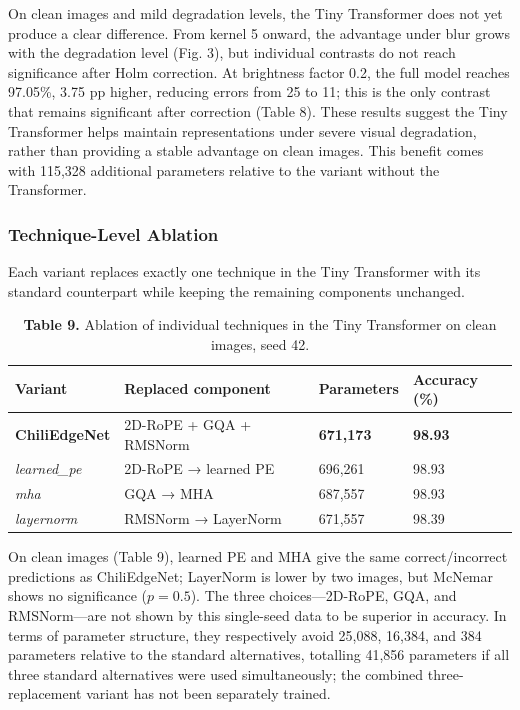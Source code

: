 On clean images and mild degradation levels, the Tiny Transformer does not yet produce a clear difference. From kernel 5 onward, the advantage under blur grows with the degradation level (Fig. 3), but individual contrasts do not reach significance after Holm correction. At brightness factor 0.2, the full model reaches 97.05\%, 3.75 pp higher, reducing errors from 25 to 11; this is the only contrast that remains significant after correction (Table 8). These results suggest the Tiny Transformer helps maintain representations under severe visual degradation, rather than providing a stable advantage on clean images. This benefit comes with 115,328 additional parameters relative to the variant without the Transformer.

\subsubsection{Technique-Level Ablation}\label{technique-level-ablation}

Each variant replaces exactly one technique in the Tiny Transformer with its standard counterpart while keeping the remaining components unchanged.

\begin{table}[H]
\centering
\caption*{\textbf{Table 9.} Ablation of individual techniques in the Tiny Transformer on clean images, seed 42.}
\label{tab:9}
\scriptsize
\setlength{\tabcolsep}{3pt}
\renewcommand{\arraystretch}{1.15}
\begin{tabular}{llll}
\toprule
\textbf{Variant} & \textbf{Replaced component} & \textbf{Parameters} & \textbf{Accuracy (\%)} \\
\midrule
\textbf{ChiliEdgeNet} & 2D-RoPE + GQA + RMSNorm & \textbf{671,173} & \textbf{98.93} \\
\emph{learned\_pe} & 2D-RoPE → learned PE & 696,261 & 98.93 \\
\emph{mha} & GQA → MHA & 687,557 & 98.93 \\
\emph{layernorm} & RMSNorm → LayerNorm & 671,557 & 98.39 \\
\bottomrule
\end{tabular}
\end{table}

On clean images (Table 9), learned PE and MHA give the same correct/incorrect predictions as ChiliEdgeNet; LayerNorm is lower by two images, but McNemar shows no significance ($p = 0.5$). The three choices---2D-RoPE, GQA, and RMSNorm---are not shown by this single-seed data to be superior in accuracy. In terms of parameter structure, they respectively avoid 25,088, 16,384, and 384 parameters relative to the standard alternatives, totalling 41,856 parameters if all three standard alternatives were used simultaneously; the combined three-replacement variant has not been separately trained.

